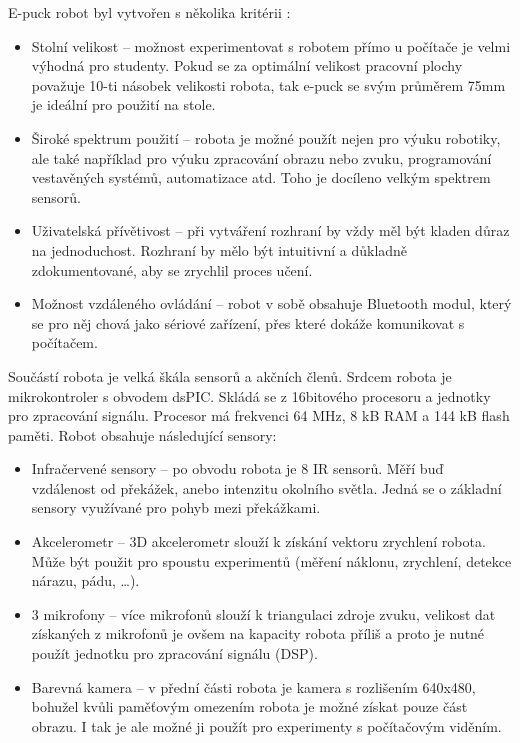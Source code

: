 \documentclass[12pt,notitlepage]{report}
\begin{document}
    E-puck robot byl vytvořen s několika kritérii \cite{bonani}:
    \begin{itemize}
        \item Stolní velikost -- možnost experimentovat s robotem přímo u
        počítače je velmi výhodná pro studenty. Pokud se za optimální velikost
        pracovní plochy považuje 10-ti násobek velikosti robota, tak e-puck se
        svým průměrem 75mm je ideální pro použití na stole.

        \item Široké spektrum použití -- robota je možné použít nejen pro výuku
        robotiky, ale také například pro výuku zpracování obrazu nebo zvuku,
        programování vestavěných systémů, automatizace atd. Toho je docíleno
        velkým spektrem sensorů.

        \item Uživatelská přívětivost -- při vytváření rozhraní by vždy měl být
        kladen důraz na jednoduchost. Rozhraní by mělo být intuitivní a
        důkladně zdokumentované, aby se zrychlil proces učení.

        \item Možnost vzdáleného ovládání -- robot v sobě obsahuje Bluetooth
        modul, který se pro něj chová jako sériové zařízení, přes které dokáže
        komunikovat s počítačem.
    \end{itemize}

    Součástí robota je velká škála sensorů a akčních členů. Srdcem robota je
    mikrokontroler s obvodem dsPIC. Skládá se z 16bitového procesoru a jednotky
    pro zpracování signálu. Procesor má frekvenci 64 MHz, 8 kB RAM a 144 kB
    flash paměti. Robot obsahuje následující sensory:

    \begin{itemize}
        \item Infračervené sensory -- po obvodu robota je 8 IR sensorů. Měří
        buď vzdálenost od překážek, anebo intenzitu okolního světla. Jedná se o
        základní sensory využívané pro pohyb mezi překážkami.

        \item Akcelerometr -- 3D akcelerometr slouží k získání vektoru
        zrychlení robota. Může být použit pro spoustu experimentů (měření
        náklonu, zrychlení, detekce nárazu, pádu, \ldots).

        \item 3 mikrofony -- více mikrofonů slouží k triangulaci zdroje zvuku,
        velikost dat získaných z mikrofonů je ovšem na kapacity robota příliš a
        proto je nutné použít jednotku pro zpracování signálu (DSP).

        \item Barevná kamera -- v přední části robota je kamera s rozlišením
        640x480, bohužel kvůli paměťovým omezením robota je možné získat pouze
        část obrazu. I tak je ale možné ji použít pro experimenty s počítačovým
        viděním.
    \end{itemize}
\end{document}
